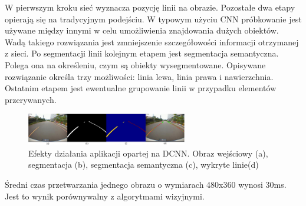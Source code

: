 W pierwszym kroku sieć wyznacza pozycję linii na obrazie. 
Pozostałe dwa etapy opierają się na tradycyjnym podejściu. 
W typowym użyciu CNN próbkowanie jest używane między innymi w celu umożliwienia znajdowania dużych obiektów. %
Wadą takiego rozwiązania jest zmniejszenie szczegółowości informacji otrzymanej z sieci.
Po segmentacji linii kolejnym etapem jest segmentacja semantyczna. 
Polega ona na określeniu, czym są obiekty wysegmentowane. 
Opisywane rozwiązanie określa trzy możliwości: linia lewa, linia prawa i nawierzchnia. 
Ostatnim etapem jest ewentualne grupowanie linii w przypadku elementów przerywanych.

\begin{figure}
  \centering
  \includegraphics[width=7cm]{img/lane_detection3_cnn_results.png}
  \caption{Efekty działania aplikacji opartej na DCNN. Obraz wejściowy (a), segmentacja (b), segmentacja semantyczna (c), wykryte linie(d)\cite{T6}}
  \label{fig:lane_detection3_cnn_results}
\end{figure}

Średni czas przetwarzania jednego obrazu o wymiarach 480x360 wynosi 30ms. Jest to wynik porównywalny z algorytmami wizyjnymi.


